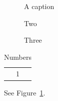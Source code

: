 \documentclass{article}
\renewcommand{\captionlabeldelim}{.}
\begin{document}
\begin{figure}[h]
\centering
{}
\caption{A caption}
\label{fig:a}
\end{figure}
\begin{figure}[h]
\renewcommand*{\captionlabeldelim}{\enskip}
\caption{Two}
\end{figure}
\begin{figure}[h]
\renewcommand*{\captionlabeldelim}{.\hskip5pt}
\caption{Three}
\end{figure}
\begin{table}[h]
\renewcommand{\captionlabeldelim}{~~~}\renewcommand{\captionlabelsep}{}
\caption{Numbers}
\begin{tabular}{c}1\end{tabular}
\end{table}
See Figure~\ref{fig:a}.
\end{document}
